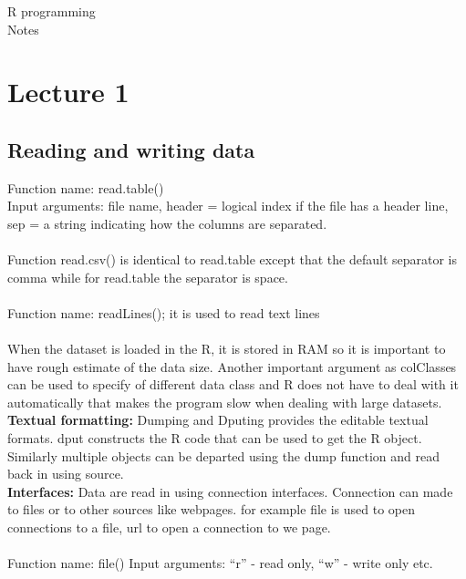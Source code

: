 \documentclass[a4paper,oneside, 12pt]{report}
\begin{document}
\begin{titlepage}
\vspace{10cm}
\begin{center}
\large
R programming\\
Notes
\end{center}

\vspace*{3cm}


\end{titlepage}

\setcounter{tocdepth}{3}
\tableofcontents
\setcounter{page}{2}
\pagebreak

\newpage
\section{Lecture 1}
\subsection{Reading and writing data}
Function name: read.table() \\
Input arguments: file name, header = logical index if the file has a header line, sep = a string indicating how the columns are separated. \\
\\
Function read.csv() is identical to read.table except that the default separator is comma while for read.table the separator is space.\\
\\
Function name: readLines(); it is used to read text lines \\
\\
When the dataset is loaded in the R, it is stored in RAM so it is important to have rough estimate of the data size. Another important argument as colClasses can be used to specify of different data class and R does not have to deal with it automatically that makes the program slow when dealing with large datasets. \\
{\bf Textual formatting:} Dumping and Dputing provides the editable textual formats. dput constructs the R code that can be used to get the R object. Similarly multiple objects can be departed using the dump function and read back in using source. \\
{\bf Interfaces:} Data are read in using connection interfaces. Connection can made to files or to other sources like webpages. for example file is used to open connections to a file, url to open a connection to we page.\\
\\
Function name: file()
Input arguments: ``r'' - read only, ``w'' - write only etc.
\end{document}
